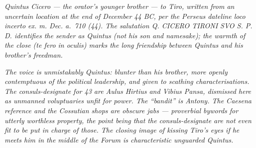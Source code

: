 
\textit{Quintus Cicero --- the orator's younger brother --- to
Tiro, written from an uncertain location at the end of December
44 BC, per the Perseus dateline \textit{loco incerto ex. m. Dec.
a.~710 (44)}. The salutation \textit{Q. CICERO TIRONI SVO S. P.
D.} identifies the sender as Quintus (not his son and namesake);
the warmth of the close (\textit{te fero in oculis}) marks the
long friendship between Quintus and his brother's freedman.}

\textit{The voice is unmistakably Quintus: blunter than his
brother, more openly contemptuous of the political leadership,
and given to scathing characterisations. The consuls-designate
for 43 are Aulus Hirtius and Vibius Pansa, dismissed here as
unmanned voluptuaries unfit for power. The ``bandit'' is Antony.
The Caesena reference and the Cossutian shops are obscure jabs
--- proverbial bywords for utterly worthless property, the point
being that the consuls-designate are not even fit to be put in
charge of \textit{those}. The closing image of kissing Tiro's
eyes if he meets him in the middle of the Forum is characteristic
unguarded Quintus.}
